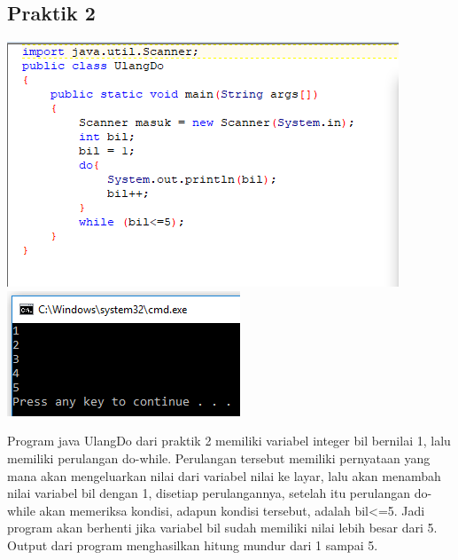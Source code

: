 \documentclass[a4paper,12pt]{article}
\begin{document}
\subsection{Praktik 2}
\begin{center}
	\includegraphics[scale=1]{Capture3}
	\includegraphics[scale=1]{Capture3_2}
\end{center}
Program java UlangDo dari praktik 2 memiliki variabel integer bil bernilai 1, lalu memiliki perulangan do-while. Perulangan tersebut memiliki pernyataan yang mana akan mengeluarkan nilai dari variabel nilai ke layar, lalu akan menambah nilai variabel bil dengan 1, disetiap perulangannya, setelah itu perulangan do-while akan memeriksa kondisi, adapun kondisi tersebut, adalah bil<=5. Jadi program akan berhenti jika variabel bil sudah memiliki nilai lebih besar dari 5. Output dari program menghasilkan hitung mundur dari 1 sampai 5.
\end{document}
